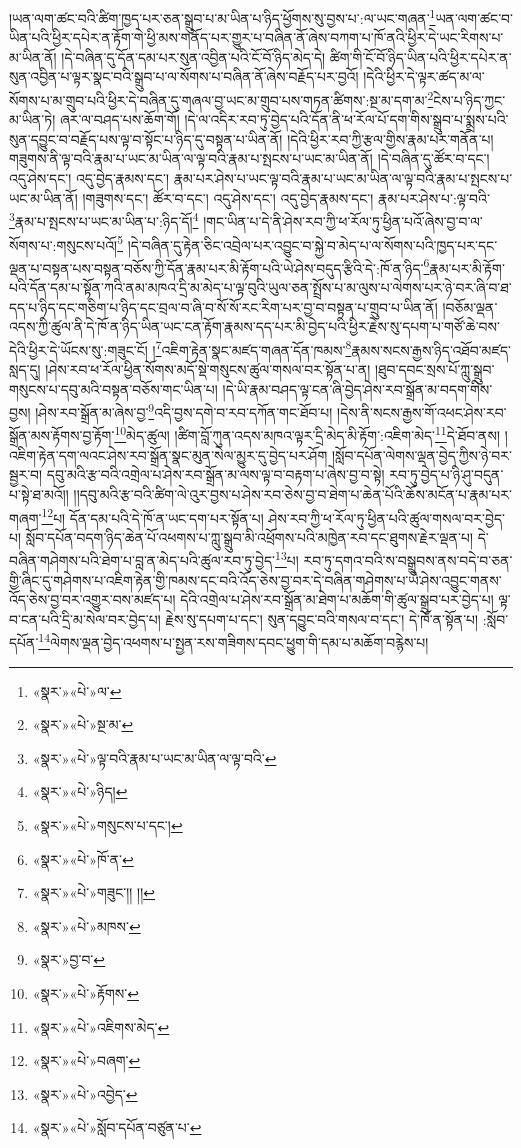 །ཡན་ལག་ཚང་བའི་ཚིག་ཁྱད་པར་ཅན་སྒྲུབ་པ་མ་ཡིན་པ་ཉིད་ཕྱོགས་སུ་བྱས་པ་:ལ་ཡང་གཞན་\footnote{«སྣར་»«པེ་»ལ་}ཡན་ལག་ཚང་བ་ཡིན་པའི་ཕྱིར་དཔེར་ན་རྟོག་གེ་ཕྱི་མས་གནོད་པར་གྱུར་པ་བཞིན་ནོ་ཞེས་བཀག་པ་ཁོ་ནའི་ཕྱིར་དེ་ཡང་རིགས་པ་མ་ཡིན་ནོ། །དེ་བཞིན་དུ་དོན་དམ་པར་སུན་འབྱིན་པའི་ངོ་བོ་ཉིད་མེད་དེ། ཚིག་གི་ངོ་བོ་ཉིད་ཡིན་པའི་ཕྱིར་དཔེར་ན་སུན་འབྱིན་པ་ལྟར་སྣང་བའི་སྒྲུབ་པ་ལ་སོགས་པ་བཞིན་ནོ་ཞེས་བརྗོད་པར་བྱའོ། །དེའི་ཕྱིར་དེ་ལྟར་ཚད་མ་ལ་སོགས་པ་མ་གྲུབ་པའི་ཕྱིར་དེ་བཞིན་དུ་གཞལ་བྱ་ཡང་མ་གྲུབ་པས་གཏན་ཚིགས་:སྔ་མ་དག་མ་\footnote{«སྣར་»«པེ་»སྔ་མ་}ངེས་པ་ཉིད་ཀྱང་མ་ཡིན་ཏེ། ཞར་ལ་བཤད་པས་ཆོག་གོ། །དེ་ལ་འདིར་རབ་ཏུ་བྱེད་པའི་དོན་ནི་ཕ་རོལ་པོ་དག་གིས་སྒྲུབ་པ་སྨྲས་པའི་སུན་དབྱུང་བ་བརྗོད་པས་ལྟ་བ་སྟོང་པ་ཉིད་དུ་བསྟན་པ་ཡིན་ནོ། །དེའི་ཕྱིར་རབ་ཀྱི་རྩལ་གྱིས་རྣམ་པར་གནོན་པ། གཟུགས་ནི་ལྟ་བའི་རྣམ་པ་ཡང་མ་ཡིན་ལ་ལྟ་བའི་རྣམ་པ་སྤངས་པ་ཡང་མ་ཡིན་ནོ། །དེ་བཞིན་དུ་ཚོར་བ་དང་། འདུ་ཤེས་དང་། འདུ་བྱེད་རྣམས་དང་། རྣམ་པར་ཤེས་པ་ཡང་ལྟ་བའི་རྣམ་པ་ཡང་མ་ཡིན་ལ་ལྟ་བའི་རྣམ་པ་སྤངས་པ་ཡང་མ་ཡིན་ནོ། །གཟུགས་དང་། ཚོར་བ་དང་། འདུ་ཤེས་དང་། འདུ་བྱེད་རྣམས་དང་། རྣམ་པར་ཤེས་པ་:ལྟ་བའི་\footnote{«སྣར་»«པེ་»ལྟ་བའི་རྣམ་པ་ཡང་མ་ཡིན་ལ་ལྟ་བའི་}རྣམ་པ་སྤངས་པ་ཡང་མ་ཡིན་པ་:ཉིད་དོ།\footnote{«སྣར་»«པེ་»ཉིད།} །གང་ཡིན་པ་དེ་ནི་ཤེས་རབ་ཀྱི་ཕ་རོལ་ཏུ་ཕྱིན་པའོ་ཞེས་བྱ་བ་ལ་སོགས་པ་:གསུངས་པའོ།\footnote{«སྣར་»«པེ་»གསུངས་པ་དང་།} །དེ་བཞིན་དུ་རྟེན་ཅིང་འབྲེལ་པར་འབྱུང་བ་སྐྱེ་བ་མེད་པ་ལ་སོགས་པའི་ཁྱད་པར་དང་ལྡན་པ་བསྟན་པས་བསྟན་བཅོས་ཀྱི་དོན་རྣམ་པར་མི་རྟོག་པའི་ཡེ་ཤེས་བདུད་རྩིའི་དེ་:ཁོ་ན་ཉིད་\footnote{«སྣར་»«པེ་»ཁོ་ན་}རྣམ་པར་མི་རྟོག་པའི་དོན་དམ་པ་སྟོན་ཀའི་ནམ་མཁའ་དྲི་མ་མེད་པ་ལྟ་བུའི་ཡུལ་ཅན་སྤྲོས་པ་མ་ལུས་པ་ལེགས་པར་ཉེ་བར་ཞི་བ་ཐ་དད་པ་ཉིད་དང་གཅིག་པ་ཉིད་དང་བྲལ་བ་ཞི་བ་སོ་སོ་རང་རིག་པར་བྱ་བ་བསྟན་པ་གྲུབ་པ་ཡིན་ནོ། །བཅོམ་ལྡན་འདས་ཀྱི་ཚུལ་ནི་དེ་ཁོ་ན་ཉིད་ཡིན་ཡང་ངན་རྟོག་རྣམས་དད་པར་མི་བྱེད་པའི་ཕྱིར་རྗེས་སུ་དཔག་པ་གཙོ་ཆེ་བས་དེའི་ཕྱིར་དེ་ཡོངས་སུ་:གཟུང་ངོ། །\footnote{«སྣར་»«པེ་»གཟུང་།། །།}འཇིག་རྟེན་སྣང་མཛད་གཞན་དོན་ཁམས་\footnote{«སྣར་»«པེ་»མཁས་}རྣམས་སངས་རྒྱས་ཉིད་འཐོབ་མཛད་སླད་དུ། །ཤེས་རབ་ཕ་རོལ་ཕྱིན་སོགས་མདོ་སྡེ་གསུངས་ཚུལ་གསལ་བར་སྟོན་པ་ན། །ཐུབ་དབང་སྲས་པོ་ཀླུ་སྒྲུབ་གསུངས་པ་དབུ་མའི་བསྟན་བཅོས་གང་ཡིན་པ། །དེ་ཡི་རྣམ་བཤད་ལྟ་ངན་ཞི་བྱེད་ཤེས་རབ་སྒྲོན་མ་བདག་གིས་བྱས། །ཤེས་རབ་སྒྲོན་མ་ཞེས་བྱ་\footnote{«སྣར་»བྱ་བ་}འདི་བྱས་དགེ་བ་རབ་དཀོན་གང་ཐོབ་པ། །དེས་ནི་སངས་རྒྱས་གོ་འཕང་ཤེས་རབ་སྒྲོན་མས་རྟོགས་བྱ་རྟོག་\footnote{«སྣར་»«པེ་»རྟོགས་}མེད་ཚུལ། །ཚིག་བློ་ཀུན་འདས་མཁའ་ལྟར་དྲི་མེད་མི་རྟོག་:འཇིག་མེད་\footnote{«སྣར་»«པེ་»འཇིགས་མེད་}དེ་ཐོབ་ནས། །འཇིག་རྟེན་དག་ལའང་ཤེས་རབ་སྒྲོན་སྣང་མུན་སེལ་མྱུར་དུ་བྱེད་པར་ཤོག །སློབ་དཔོན་ལེགས་ལྡན་བྱེད་ཀྱིས་ཉེ་བར་སྦྱར་བ། དབུ་མའི་རྩ་བའི་འགྲེལ་པ་ཤེས་རབ་སྒྲོན་མ་ལས་ལྟ་བ་བརྟག་པ་ཞེས་བྱ་བ་སྟེ། རབ་ཏུ་བྱེད་པ་ཉི་ཤུ་བདུན་པ་སྟེ་ཐ་མའོ།། །།དབུ་མའི་རྩ་བའི་ཚིག་ལེ་འུར་བྱས་པ་ཤེས་རབ་ཅེས་བྱ་བ་ཐེག་པ་ཆེན་པོའི་ཆོས་མངོན་པ་རྣམ་པར་གཞག་\footnote{«སྣར་»«པེ་»བཞག་}པ། དོན་དམ་པའི་དེ་ཁོ་ན་ཡང་དག་པར་སྟོན་པ། ཤེས་རབ་ཀྱི་ཕ་རོལ་ཏུ་ཕྱིན་པའི་ཚུལ་གསལ་བར་བྱེད་པ། སློབ་དཔོན་བདག་ཉིད་ཆེན་པོ་འཕགས་པ་ཀླུ་སྒྲུབ་མི་འཕྲོགས་པའི་མཁྱེན་རབ་དང་ཐུགས་རྗེར་ལྡན་པ། དེ་བཞིན་གཤེགས་པའི་ཐེག་པ་བླ་ན་མེད་པའི་ཚུལ་རབ་ཏུ་བྱེད་\footnote{«སྣར་»«པེ་»འབྱེད་}པ། རབ་ཏུ་དགའ་བའི་ས་བསྒྲུབས་ནས་བདེ་བ་ཅན་གྱི་ཞིང་དུ་གཤེགས་པ་འཇིག་རྟེན་གྱི་ཁམས་དང་བའི་འོད་ཅེས་བྱ་བར་དེ་བཞིན་གཤེགས་པ་ཡེ་ཤེས་འབྱུང་གནས་འོད་ཅེས་བྱ་བར་འགྱུར་བས་མཛད་པ། དེའི་འགྲེལ་པ་ཤེས་རབ་སྒྲོན་མ་ཐེག་པ་མཆོག་གི་ཚུལ་སྒྲུབ་པར་བྱེད་པ། ལྟ་བ་ངན་པའི་དྲི་མ་སེལ་བར་བྱེད་པ། རྗེས་སུ་དཔག་པ་དང་། སུན་དབྱུང་བའི་གསལ་བ་དང་། དེ་ཁོ་ན་སྟོན་པ། :སློབ་དཔོན་\footnote{«སྣར་»«པེ་»སློབ་དཔོན་བཙུན་པ་}ལེགས་ལྡན་བྱེད་འཕགས་པ་སྤྱན་རས་གཟིགས་དབང་ཕྱུག་གི་དམ་པ་མཆོག་བརྙེས་པ། 
